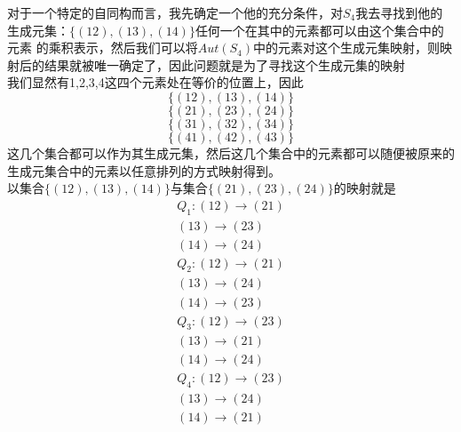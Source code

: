 \documentclass[utf8]{ctexart}
\begin{document}
对于一个特定的自同构而言，我先确定一个他的充分条件，对$S_{4}$我去寻找到他的生成元集：$\{(12),(13),(14)\}$任何一个在其中的元素都可以由这个集合中的元素 的乘积表示，然后我们可以将$Aut(S_{4})$中的元素对这个生成元集映射，则映射后的结果就被唯一确定了，因此问题就是为了寻找这个生成元集的映射\\我们显然有{1,2,3,4}这四个元素处在等价的位置上，因此
$$\{(12),(13),(14)\}$$
$$\{(21),(23),(24)\}$$
$$\{(31),(32),(34)\}$$
$$\{(41),(42),(43)\}$$
这几个集合都可以作为其生成元集，然后这几个集合中的元素都可以随便被原来的生成元集合中的元素以任意排列的方式映射得到。\\
以集合$\{(12),(13),(14)\}$与集合$\{(21),(23),(24)\}$的映射就是
\begin{align*}
	Q_{1}: (12)\rightarrow (21) \\
	(13)\rightarrow (23)\\
	(14)\rightarrow (24)
\end{align*}
\begin{align*}
	Q_{2}: (12)\rightarrow (21) \\
	(13)\rightarrow (24)\\
	(14)\rightarrow (23)
\end{align*}
\begin{align*}
	Q_{3}: (12)\rightarrow (23) \\
	(13)\rightarrow (21)\\
	(14)\rightarrow (24)
\end{align*}
\begin{align*}
	Q_{4}: (12)\rightarrow (23) \\
	(13)\rightarrow (24)\\
	(14)\rightarrow (21)
\end{align*}
\end{document}
